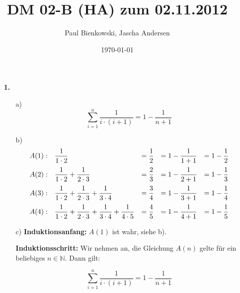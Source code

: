 \documentclass[a4paper,10pt]{scrartcl}
\author{Paul Bienkowski, Jascha Andersen}
\title{DM 02-B (HA) zum 02.11.2012}
\date{\today}
\begin{document}
\setcounter{secnumdepth}{0}
\maketitle

\begin{enumerate}
    \item[\textbf{1.}]
        \begin{enumerate}
            \item[a)]
                $$\sum_{i=1}^{n} \frac{1}{i \cdot (i + 1)} = 1 - \frac{1}{n + 1}$$

            \item[b)]
                $$\begin{array}{l *5{>{\displaystyle}l}}
                    A(1): &
                        \frac{1}{1 \cdot 2} &
                        = \frac{1}{2} &
                        = 1 - \frac{1}{1 + 1} &
                        = 1 - \frac{1}{2}\\[1em]
                    A(2): &
                        \frac{1}{1 \cdot 2} + \frac{1}{2 \cdot 3} &
                        = \frac{2}{3} &
                        = 1 - \frac{1}{2 + 1} &
                        = 1 - \frac{1}{3}\\[1em]
                    A(3): &
                        \frac{1}{1 \cdot 2} + \frac{1}{2 \cdot 3} + \frac{1}{3 \cdot 4} &
                        = \frac{3}{4} &
                        = 1 - \frac{1}{3 + 1} &
                        = 1 - \frac{1}{4}\\[1em]
                    A(4): &
                        \frac{1}{1 \cdot 2} + \frac{1}{2 \cdot 3} + \frac{1}{3 \cdot 4} + \frac{1}{4 \cdot 5} &
                        = \frac{4}{5} &
                        = 1 - \frac{1}{4 + 1} &
                        = 1 - \frac{1}{5}\\
                \end{array}$$

            \item[c)]
                \textbf{Induktionsanfang:} $A(1)$ ist wahr, siehe b).

                \textbf{Induktionsschritt:} Wir nehmen an, die Gleichung $A(n)$ gelte für ein beliebiges $n \in \mathbb{N}$. Dann gilt:

                \begin{equation}\label{eq:1cIA}\tag{IA}
                    \sum_{i=1}^{n} \frac{1}{i \cdot (i + 1)} = 1 - \frac{1}{n + 1}
                \end{equation}


\end{enumerate}
\end{enumerate}
\end{document}
